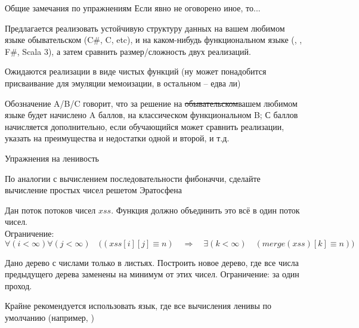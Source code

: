 \newcommand\exscore[3]{#1/#2/#3}


\begin{frame}{Общие замечания по упражнениям}
Если явно не оговорено иное, то...
\vspace{2em}

Предлагается реализовать устойчивую структуру данных на вашем любимом языке обывательском (C\#, C, etc), и на каком-нибудь функциональном языке (\OCaml{}, \Haskell{}, F\#, Scala 3), а затем сравнить размер/сложность двух реализаций.

Ожидаются реализации в виде чистых функций (ну может понадобится присваивание для эмуляции мемоизации, в остальном -- едва ли)
\vspace{2em}

Обозначение \exscore{A}{B}{C} говорит, что за решение на \sout{обывательском}вашем любимом языке будет начислено A баллов, на классическом функциональном B; С баллов начисляется дополнительно, если обучающийся может сравнить реализации, указать на преимущества и недостатки одной и второй, и т.д.
\end{frame}



\begin{frame}[allowframebreaks]{Упражнения на ленивость}
\begin{exercise}[1 балл]
По аналогии с вычислением последовательности фибоначчи, сделайте вычисление простых чисел решетом Эратосфена
\end{exercise}

\begin{exercise}[1 балл]
Дан поток потоков чисел $xss$. Функция  должно объединить это всё в один поток чисел. \\
Ограничение: $\forall (i<\infty) \forall (j<\infty)\quad \big((xss[i][j]\equiv n)\quad \Longrightarrow \quad\exists (k<\infty)\quad (merge(xss)[k]\equiv n)\big)$
\end{exercise}

\begin{exercise}[2 балла]
Дано дерево с числами только в листьях. Построить новое дерево, где все числа предыдущего дерева заменены на минимум от этих чисел. Ограничение: за один проход.
\begin{remark}
Крайне рекомендуется использовать язык, где все вычисления ленивы по умолчанию (например, \Haskell)
\end{remark}
\end{exercise}
\end{frame}



